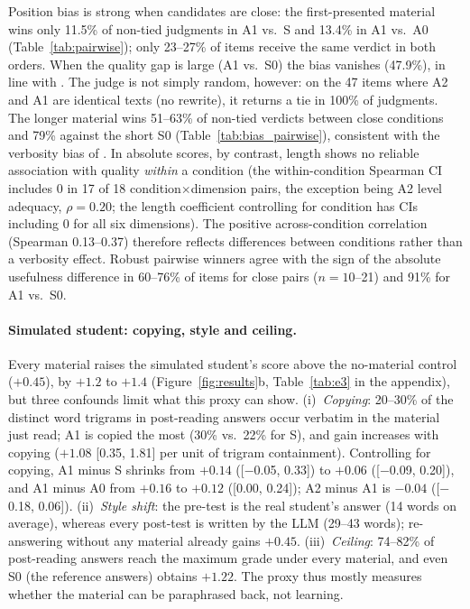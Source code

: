 \documentclass[11pt]{article}
\begin{document}
Position bias is strong when candidates are close: the first-presented material wins only 11.5\% of non-tied judgments in A1 vs.\ S and 13.4\% in A1 vs.\ A0 (Table~\ref{tab:pairwise}); only 23--27\% of items receive the same verdict in both orders. When the quality gap is large (A1 vs.\ S0) the bias vanishes (47.9\%), in line with \citet{shi2025}. The judge is not simply random, however: on the 47 items where A2 and A1 are identical texts (no rewrite), it returns a tie in 100\% of judgments. The longer material wins 51--63\% of non-tied verdicts between close conditions and 79\% against the short S0 (Table~\ref{tab:bias_pairwise}), consistent with the verbosity bias of \citet{zheng2023}. In absolute scores, by contrast, length shows no reliable association with quality \emph{within} a condition (the within-condition Spearman CI includes 0 in 17 of 18 condition$\times$dimension pairs, the exception being A2 level adequacy, $\rho=0.20$; the length coefficient controlling for condition has CIs including 0 for all six dimensions). The positive across-condition correlation (Spearman 0.13--0.37) therefore reflects differences between conditions rather than a verbosity effect. Robust pairwise winners agree with the sign of the absolute usefulness difference in 60--76\% of items for close pairs ($n{=}10$--21) and 91\% for A1 vs.\ S0.

\paragraph{Simulated student: copying, style and ceiling.} Every material raises the simulated student's score above the no-material control ($+0.45$), by $+1.2$ to $+1.4$ (Figure~\ref{fig:results}b, Table~\ref{tab:e3} in the appendix), but three confounds limit what this proxy can show. (i)~\emph{Copying}: 20--30\% of the distinct word trigrams in post-reading answers occur verbatim in the material just read; A1 is copied the most (30\% vs.\ 22\% for S), and gain increases with copying ($+1.08$ [0.35, 1.81] per unit of trigram containment). Controlling for copying, A1 minus S shrinks from $+0.14$ ([$-$0.05, 0.33]) to $+0.06$ ([$-$0.09, 0.20]), and A1 minus A0 from $+0.16$ to $+0.12$ ([0.00, 0.24]); A2 minus A1 is $-0.04$ ([$-$0.18, 0.06]). (ii)~\emph{Style shift}: the pre-test is the real student's answer (14 words on average), whereas every post-test is written by the LLM (29--43 words); re-answering without any material already gains $+0.45$. (iii)~\emph{Ceiling}: 74--82\% of post-reading answers reach the maximum grade under every material, and even S0 (the reference answers) obtains $+1.22$. The proxy thus mostly measures whether the material can be paraphrased back, not learning.
\end{document}

